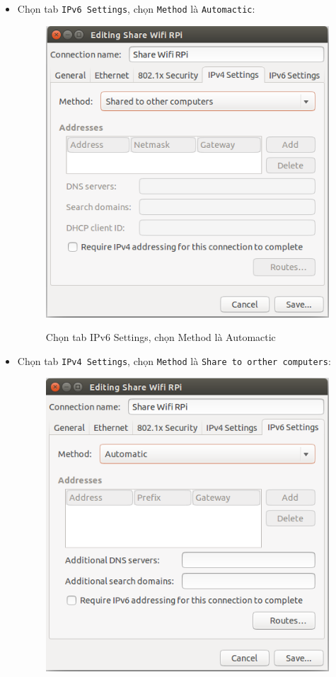\begin{itemize}
\begin{figure}[!h]
\begin{center}
\end{center}
\end{figure}
\item Chọn tab \verb|IPv6 Settings|, chọn \verb|Method| là \verb|Automactic|:
\begin{figure}[!h]
\begin{center}
{\includegraphics[scale=.4]{network/images/share-wifi-5}}
\caption{Chọn tab \textsf{IPv6 Settings}, chọn \textsf{Method} là \textsf{Automactic}}
\end{center}
\end{figure}
\item Chọn tab \verb|IPv4 Settings|, chọn \verb|Method| là \verb|Share to orther computers|:
\begin{figure}[!h]
\begin{center}
{\includegraphics[scale=.5]{network/images/share-wifi-6}}

\end{center}
\end{figure}
\end{itemize}
